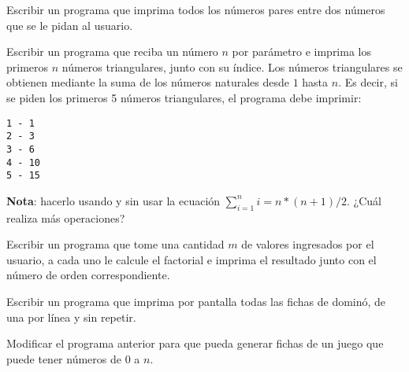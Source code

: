 \begin{ejercicio}
Escribir un programa que imprima todos los números pares entre dos números
que se le pidan al usuario.
\end{ejercicio}

\begin{ejercicio}
Escribir un programa que reciba un número $n$ por
parámetro e imprima los primeros $n$ números triangulares, junto con su
índice. Los números triangulares se obtienen mediante la suma de los números
naturales desde $1$ hasta $n$.  Es decir, si se piden los primeros 5
números triangulares, el programa debe imprimir:

\begin{verbatim}
1 - 1
2 - 3
3 - 6
4 - 10
5 - 15
\end{verbatim}

{\bf Nota}: hacerlo usando y sin usar la ecuación $\sum_{i=1}^n i = n*(n+1)/2$.
¿Cuál realiza más operaciones?
\end{ejercicio}

\begin{ejercicio}
Escribir un programa que tome una cantidad $m$ de valores ingresados
por el usuario, a cada uno le calcule el factorial e imprima el resultado
junto con el número de orden correspondiente.
\end{ejercicio}

\begin{ejercicio}
Escribir un programa que imprima por pantalla todas las fichas de dominó, de
una por línea y sin repetir.
\end{ejercicio}

\begin{ejercicio}
Modificar el programa anterior para que pueda generar fichas de un juego
que puede tener números de 0 a $n$.
\end{ejercicio}
